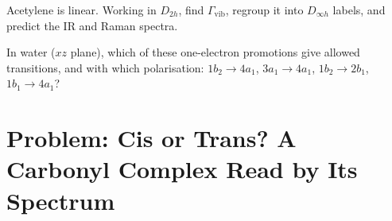 \begin{exercise}[$\star\star\star$]\label{exo:b3:group-theory-applied:11}
Acetylene  is linear. Working in $D_{2h}$, find $\Gamma_{\mathrm{vib}}$, regroup
it into $D_{\infty h}$ labels, and predict the IR and Raman spectra.
\end{exercise}

\begin{exercise}[$\star\star\star$]\label{exo:b3:group-theory-applied:12}
In water ($xz$ plane), which of these one-electron promotions give allowed
transitions, and with which polarisation: $1b_2 \to 4a_1$, $3a_1 \to 4a_1$,
$1b_2 \to 2b_1$, $1b_1 \to 4a_1$?
\end{exercise}

\section{Problem: Cis or Trans? A Carbonyl Complex Read by Its Spectrum}

